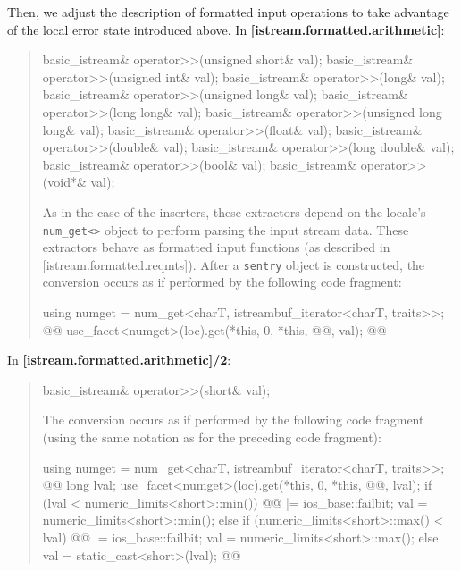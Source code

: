 \documentclass{wg21}
\begin{document}
Then, we adjust the description of formatted input operations to take advantage
of the local error state introduced above. In \textbf{[istream.formatted.arithmetic]}:
\begin{quote}
\begin{codeblock}
basic_istream& operator>>(unsigned short& val);
basic_istream& operator>>(unsigned int& val);
basic_istream& operator>>(long& val);
basic_istream& operator>>(unsigned long& val);
basic_istream& operator>>(long long& val);
basic_istream& operator>>(unsigned long long& val);
basic_istream& operator>>(float& val);
basic_istream& operator>>(double& val);
basic_istream& operator>>(long double& val);
basic_istream& operator>>(bool& val);
basic_istream& operator>>(void*& val);
\end{codeblock}
As in the case of the inserters, these extractors depend on the locale's
\texttt{num_get<>} object to perform parsing the input stream data.
These extractors behave as formatted input functions (as described in [istream.formatted.reqmts]).
After a \texttt{sentry} object is constructed, the conversion occurs as if performed by
the following code fragment:

\begin{codeblock}
  using numget = num_get<charT, istreambuf_iterator<charT, traits>>;
  @@
  use_facet<numget>(loc).get(*this, 0, *this, @@, val);
  @@
\end{codeblock}
\end{quote}

In \textbf{[istream.formatted.arithmetic]/2}:
\begin{quote}
\begin{codeblock}
basic_istream& operator>>(short& val);
\end{codeblock}
The conversion occurs as if performed by the following code fragment (using the
same notation as for the preceding code fragment):
\begin{codeblock}
  using numget = num_get<charT, istreambuf_iterator<charT, traits>>;
  @@
  long lval;
  use_facet<numget>(loc).get(*this, 0, *this, @@, lval);
  if (lval < numeric_limits<short>::min()) {
    @@ |= ios_base::failbit;
    val = numeric_limits<short>::min();
  } else if (numeric_limits<short>::max() < lval) {
    @@ |= ios_base::failbit;
    val = numeric_limits<short>::max();
  }  else
    val = static_cast<short>(lval);
  @@
\end{codeblock}
\end{quote}
\end{document}
